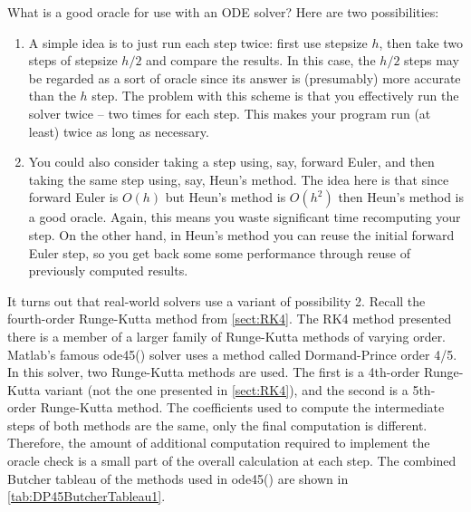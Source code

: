 \documentclass[hidelinks,notitlepage]{book}
\begin{document}
What is a good oracle for use with an ODE solver?   Here are two possibilities:
\begin{enumerate}
\item A simple idea is to just run each step twice: first use stepsize $h$, then take two steps of stepsize $h/2$ and compare the results.  In this case, the $h/2$ steps may be regarded as a sort of oracle since its answer is (presumably) more accurate than the $h$ step.  The problem with this scheme is that you effectively run the solver twice -- two times for each step.  This makes your program run (at least) twice as long as necessary.
\item You could also consider taking a step using, say, forward Euler, and then taking the same step using, say, Heun's method.  The idea here is that since forward Euler is $O(h)$ but Heun's method is $O(h^2)$ then Heun's method is a good oracle.  Again, this means you waste significant time recomputing your step.  On the other hand, in Heun's method you can reuse the initial forward Euler step, so you get back some some performance through reuse of previously computed results.
\end{enumerate}
It turns out that real-world solvers use a variant of possibility 2.  Recall the fourth-order Runge-Kutta method from \cref{sect:RK4}.  The RK4 method presented there is a member of a larger family of Runge-Kutta methods of varying order.  Matlab's famous ode45() solver uses a method called Dormand-Prince order 4/5.  In this solver, two Runge-Kutta methods are used.  The first is a 4th-order Runge-Kutta variant (not the one presented in \cref{sect:RK4}), and the second is a 5th-order Runge-Kutta method.  The coefficients used to compute the intermediate steps of both methods are the same, only the final computation is different.  Therefore, the amount of additional computation required to implement the oracle check is a small part of the overall calculation at each step.  The combined Butcher tableau of the methods used in ode45() are shown in \cref{tab:DP45ButcherTableau1}. 
\end{document}
